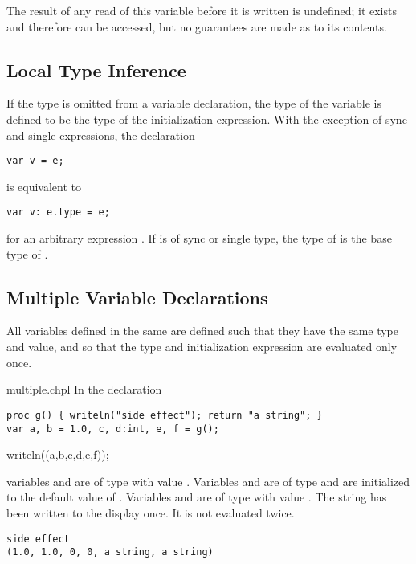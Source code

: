 The result of any read of this variable before it is written is
undefined; it exists and therefore can be accessed, but no guarantees
are made as to its contents.

\subsection{Local Type Inference}
\label{Local_Type_Inference}

If the type is omitted from a variable declaration, the type of the
variable is defined to be the type of the initialization expression.
With the exception of sync and single expressions, the declaration
\begin{chapel}
\begin{verbatim}
var v = e;
\end{verbatim}
\end{chapel}
is equivalent to
\begin{chapel}
\begin{verbatim}
var v: e.type = e;
\end{verbatim}
\end{chapel}
for an arbitrary expression .  If  is of sync or
single type, the type of  is the base type of .

\subsection{Multiple Variable Declarations}
\label{Multiple_Variable_Declarations}

All variables defined in the same  are defined
such that they have the same type and value, and so that the type and
initialization expression are evaluated only once.

\begin{chapelexample}{multiple.chpl}
In the declaration
\begin{chapel}
\begin{verbatim}
proc g() { writeln("side effect"); return "a string"; }
var a, b = 1.0, c, d:int, e, f = g();
\end{verbatim}
\end{chapel}
\begin{chapelpost}
writeln((a,b,c,d,e,f));
\end{chapelpost}
variables  and  are of type  with
value .  Variables  and  are of
type  and are initialized to the default value of .
Variables  and  are of type  with
value .  The string  has been
written to the display once.  It is not evaluated twice.
\begin{chapeloutput}
\begin{verbatim}
side effect
(1.0, 1.0, 0, 0, a string, a string)
\end{verbatim}
\end{chapeloutput}
\end{chapelexample}

